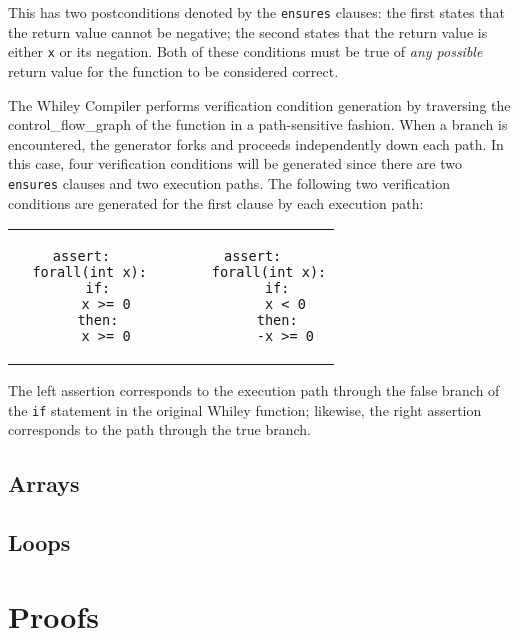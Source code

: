 This has two postconditions denoted by the \lstinline{ensures}
clauses: the first states that the return value cannot be negative;
the second states that the return value is either \lstinline{x} or its
negation.  Both of these conditions must be true of {\em any possible}
return value for the function to be considered correct.

The Whiley Compiler performs verification condition generation by
traversing the \gls{control_flow_graph} of the function in a
path-sensitive fashion.  When a branch is encountered, the generator
forks and proceeds independently down each path.  In this case, four
verification conditions will be generated since there are two
\lstinline{ensures} clauses and two execution paths.  The following
two verification conditions are generated for the first clause by each
execution path:

\begin{center}
\begin{tabular}{c c c}
\begin{minipage}[t]{0.45\textwidth}
\begin{lstlisting}[language=WyAL]
assert:
  forall(int x):
    if:
      x >= 0
    then:
      x >= 0
\end{lstlisting}
\end{minipage}&&
\begin{minipage}[t]{0.45\textwidth}
\begin{lstlisting}[language=WyAL]
  assert:
    forall(int x):
      if:
        x < 0
      then:
        -x >= 0
\end{lstlisting}
\end{minipage}\\
\end{tabular}
\end{center}
The left assertion corresponds to the execution path through the false
branch of the \lstinline{if} statement in the original Whiley
function; likewise, the right assertion corresponds to the path
through the true branch.  

\subsection{Arrays}
\subsection{Loops}


\section{Proofs}

